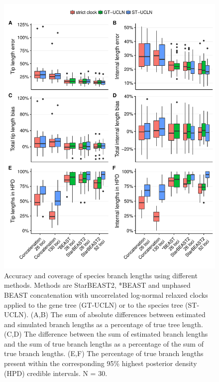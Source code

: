 \documentclass[12pt]{article}
\begin{document}
\begin{figure}[htb!]
\centering
\includegraphics[width=130mm]{branch_length_accuracy_unphased.pdf}
\caption
{Accuracy and coverage of species branch lengths using different methods. Methods are StarBEAST2,
*BEAST and unphased BEAST concatenation with uncorrelated log-normal relaxed clocks applied
to the gene tree (GT-UCLN) or to the species tree (ST-UCLN). (A,B) The sum of absolute
differences between estimated and simulated branch lengths as a percentage of true
tree length. (C,D) The difference between the sum of estimated branch lengths and the
sum of true branch lengths as a percentage of the sum of true branch lengths. (E,F) The
percentage of true branch lengths present within the corresponding 95\% highest posterior density (HPD)
credible intervals. N = 30.}
\label{fig:branchLengthsError}
\end{figure}

\clearpage
\end{document}
